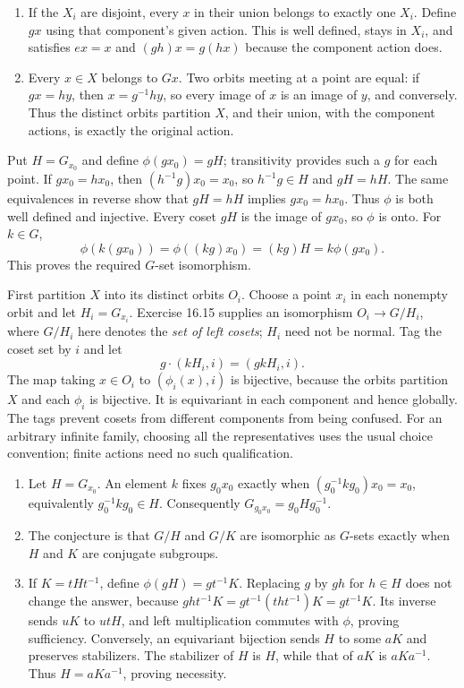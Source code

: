 \begin{enumerate}[label=(\alph*)]
\item If the $X_i$ are disjoint, every $x$ in their union belongs to exactly
one $X_i$. Define $gx$ using that component's given action. This is
well defined, stays in $X_i$, and satisfies $ex=x$ and $(gh)x=g(hx)$ because
the component action does.
\item Every $x\in X$ belongs to $Gx$. Two orbits meeting at a point are
equal: if $gx=hy$, then $x=g^{-1}hy$, so every image of $x$ is an image of
$y$, and conversely. Thus the distinct orbits partition $X$, and their
union, with the component actions, is exactly the original action.
\end{enumerate}

Put $H=G_{x_0}$ and define $\phi(gx_0)=gH$; transitivity provides such a $g$
for each point.
If $gx_0=hx_0$, then $(h^{-1}g)x_0=x_0$, so $h^{-1}g\in H$ and $gH=hH$.
The same equivalences in reverse show that $gH=hH$ implies $gx_0=hx_0$.
Thus $\phi$ is both well defined and injective.
Every coset $gH$ is the image of $gx_0$, so $\phi$ is onto. For $k\in G$,
\[
\phi(k(gx_0))=\phi((kg)x_0)=(kg)H=k\phi(gx_0).
\]
This proves the required $G$-set isomorphism.

First partition $X$ into its distinct orbits $O_i$. Choose a point $x_i$ in
each nonempty orbit and let $H_i=G_{x_i}$. Exercise 16.15 supplies an
isomorphism $O_i\to G/H_i$, where $G/H_i$ here denotes the \emph{set of left
cosets}; $H_i$ need not be normal. Tag the coset set by $i$ and let
\[
g\cdot(kH_i,i)=(gkH_i,i).
\]
The map taking $x\in O_i$ to $(\phi_i(x),i)$ is bijective, because the orbits
partition $X$ and each $\phi_i$ is bijective. It is equivariant in each
component and hence globally. The tags prevent cosets from different
components from being confused. For an arbitrary infinite family, choosing
all the representatives uses the usual choice convention; finite actions
need no such qualification.

\begin{enumerate}[label=(\alph*)]
\item Let $H=G_{x_0}$. An element $k$ fixes $g_0x_0$ exactly when
$(g_0^{-1}kg_0)x_0=x_0$, equivalently $g_0^{-1}kg_0\in H$.
Consequently $G_{g_0x_0}=g_0Hg_0^{-1}$.
\item The conjecture is that $G/H$ and $G/K$ are isomorphic as $G$-sets
exactly when $H$ and $K$ are conjugate subgroups.
\item If $K=tHt^{-1}$, define $\phi(gH)=gt^{-1}K$.
Replacing $g$ by $gh$ for $h\in H$ does not change the answer, because
$ght^{-1}K=gt^{-1}(tht^{-1})K=gt^{-1}K$.
Its inverse sends $uK$ to $utH$, and left multiplication commutes with
$\phi$, proving sufficiency. Conversely, an equivariant bijection sends
$H$ to some $aK$ and preserves stabilizers. The stabilizer of $H$ is $H$,
while that of $aK$ is $aKa^{-1}$. Thus $H=aKa^{-1}$, proving necessity.
\end{enumerate}

